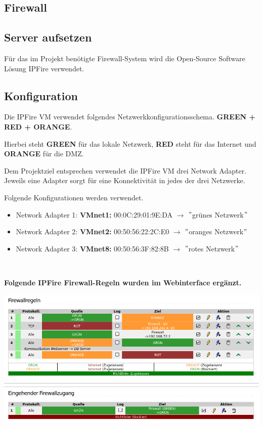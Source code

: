 \documentclass{scrartcl}
\begin{document}
\begin{flushleft}
    \section{Firewall}
    \subsection{Server aufsetzen}
    Für das im Projekt benötigte Firewall-System wird die Open-Source Software Lösung IPFire verwendet. 

    \subsection{Konfiguration}
    Die IPFire VM verwendet folgendes Netzwerkkonfigurationsschema. \newline
    \textbf{GREEN + RED + ORANGE}. \newline

    Hierbei steht \textbf{GREEN} für das lokale Netzwerk, \textbf{RED} steht für das Internet und \textbf{ORANGE} für die DMZ. \newline \newline

    Dem Projektziel entsprechen verwendet die IPFire VM drei Network Adapter.
    Jeweils eine Adapter sorgt für eine Konnektivität in jedes der drei Netzwerke. \newline
    
    Folgende Konfigurationen werden verwendet.
    \begin{itemize}
        \item Network Adapter 1:
        \subitem \textbf{VMnet1:} 00:0C:29:01:9E:DA $\rightarrow$ $"$grünes Netzwerk$"$
        \item Network Adapter 2:
        \subitem \textbf{VMnet2:} 00:50:56:22:2C:E0 $\rightarrow$ $"$oranges Netzwerk$"$
        \item Network Adapter 3:
        \subitem \textbf{VMnet8:} 00:50:56:3F:82:8B $\rightarrow$ $"$rotes Netzwerk$"$
    \end{itemize}
    \ \newline

    \textbf{Folgende IPFire Firewall-Regeln wurden im Webinterface ergänzt.}
    
    \includegraphics[width=\linewidth]{img/ipfire/6.png}
           

\end{flushleft}
\end{document}
